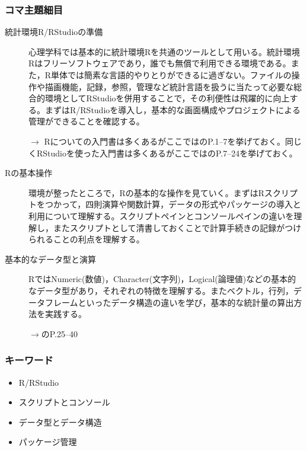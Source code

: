 \subsubsection{コマ主題細目}
\begin{description}

    \item[統計環境R/RStudioの準備] 心理学科では基本的に統計環境Rを共通のツールとして用いる。統計環境Rはフリーソフトウェアであり，誰でも無償で利用できる環境である。また，R単体では簡素な言語的やりとりができるに過ぎない。ファイルの操作や描画機能，記録，参照，管理など統計言語を扱うに当たって必要な総合的環境としてRStudioを併用することで，その利便性は飛躍的に向上する。まずはR/RStudioを導入し，基本的な画面構成やプロジェクトによる管理ができることを確認する。
	      \begin{flushright}
		      $\to$ Rについての入門書は多くあるがここでは\textcite{kosugi2019}のP.1--7を挙げておく。同じくRStudioを使った入門書は多くあるがここでは\textcite{kosugi2019}のP.7--24を挙げておく。
	      \end{flushright}

	\item[Rの基本操作]環境が整ったところで，Rの基本的な操作を見ていく。まずはRスクリプトをつかって，四則演算や関数計算，データの形式やパッケージの導入と利用について理解する。スクリプトペインとコンソールペインの違いを理解し，またスクリプトとして清書しておくことで計算手続きの記録がつけられることの利点を理解する。

	\item[基本的なデータ型と演算] RではNumeric(数値)，Character(文字列)，Logical(論理値)などの基本的なデータ型があり，それぞれの特徴を理解する。またベクトル，行列，データフレームといったデータ構造の違いを学び，基本的な統計量の算出方法を実践する。
          \begin{flushright}
              $\to$\textcite{kosugi2019}のP.25--40
          \end{flushright}

\end{description}
\subsubsection{キーワード}
\begin{itemize}
    \item R/RStudio
    \item スクリプトとコンソール
    \item データ型とデータ構造
    \item パッケージ管理
\end{itemize}
